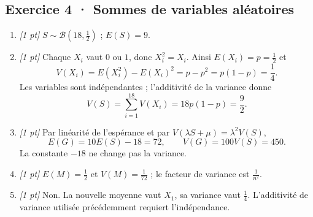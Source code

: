\subsection*{Exercice 4 · Sommes de variables aléatoires}\begin{enumerate}

\item \textit{[1 pt]} $S\sim\mathcal B(18,\frac{1}{2})$ ; $E(S)=9$.

\item \textit{[1 pt]} Chaque $X_i$ vaut $0$ ou $1$, donc $X_i^2=X_i$. Ainsi $E(X_i)=p=\frac{1}{2}$ et
\[V(X_i)=E(X_i^2)-E(X_i)^2=p-p^2=p(1-p)=\frac{1}{4}.\]
Les variables sont indépendantes ; l'additivité de la variance donne
\[V(S)=\sum_{i=1}^{18}V(X_i)=18p(1-p)=\frac{9}{2}.\]

\item \textit{[1 pt]} Par linéarité de l'espérance et par $V(\lambda S+\mu)=\lambda^2V(S)$,
\[E(G)=10E(S)-18=72,\qquad V(G)=100V(S)=450.\]
La constante $-18$ ne change pas la variance.

\item \textit{[1 pt]} $E(M)=\frac{1}{2}$ et $V(M)=\frac{1}{72}$ ; le facteur de variance est $\frac{1}{n^2}$.

\item \textit{[1 pt]} Non. La nouvelle moyenne vaut $X_1$, sa variance vaut $\frac{1}{4}$. L'additivité de variance utilisée précédemment requiert l'indépendance.

\end{enumerate}

\fi

\fi

